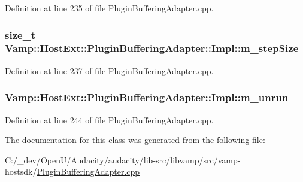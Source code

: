 Definition at line 235 of file Plugin\+Buffering\+Adapter.\+cpp.

\subsubsection[{\texorpdfstring{m\+\_\+step\+Size}{m_stepSize}}]{\setlength{\rightskip}{0pt plus 5cm}size\+\_\+t Vamp\+::\+Host\+Ext\+::\+Plugin\+Buffering\+Adapter\+::\+Impl\+::m\+\_\+step\+Size\hspace{0.3cm}{\ttfamily [protected]}}\hypertarget{class_vamp_1_1_host_ext_1_1_plugin_buffering_adapter_1_1_impl_a23535474c13c9ed9c2a3dfdcb0943050}{}\label{class_vamp_1_1_host_ext_1_1_plugin_buffering_adapter_1_1_impl_a23535474c13c9ed9c2a3dfdcb0943050}


Definition at line 237 of file Plugin\+Buffering\+Adapter.\+cpp.

\subsubsection[{\texorpdfstring{m\+\_\+unrun}{m_unrun}}]{ Vamp\+::\+Host\+Ext\+::\+Plugin\+Buffering\+Adapter\+::\+Impl\+::m\+\_\+unrun\hspace{0.3cm}{\ttfamily [protected]}}\hypertarget{class_vamp_1_1_host_ext_1_1_plugin_buffering_adapter_1_1_impl_afa825144d91babf38fb27aa7c287dc1e}{}\label{class_vamp_1_1_host_ext_1_1_plugin_buffering_adapter_1_1_impl_afa825144d91babf38fb27aa7c287dc1e}


Definition at line 244 of file Plugin\+Buffering\+Adapter.\+cpp.



The documentation for this class was generated from the following file\+:\begin{DoxyCompactItemize}
\item 
C\+:/\+\_\+dev/\+Open\+U/\+Audacity/audacity/lib-\/src/libvamp/src/vamp-\/hostsdk/\hyperlink{_plugin_buffering_adapter_8cpp}{Plugin\+Buffering\+Adapter.\+cpp}\end{DoxyCompactItemize}
